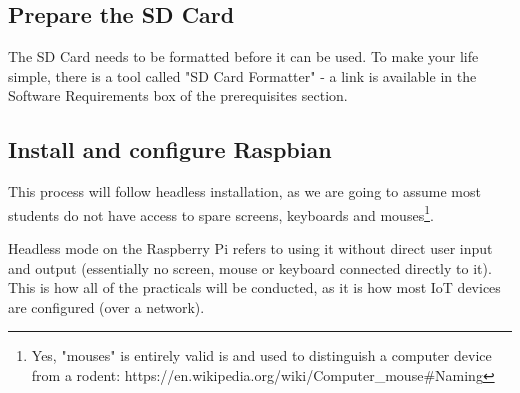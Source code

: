 \subsection{Prepare the SD Card}
The SD Card needs to be formatted before it can be used. To make your life simple, there is a tool called "SD Card Formatter" - a link is available in the Software Requirements box of the prerequisites section.

\subsection{Install and configure Raspbian}
This process will follow headless installation, as we are going to assume most students do not have access to spare screens, keyboards and mouses\footnote{Yes, "mouses" is entirely valid is and used to distinguish a computer device from a rodent: https://en.wikipedia.org/wiki/Computer\_mouse\#Naming}.

Headless mode on the Raspberry Pi refers to using it without direct user input and output (essentially no screen, mouse or keyboard connected directly to it). This is how all of the practicals will be conducted, as it is how most IoT devices are configured (over a network).

